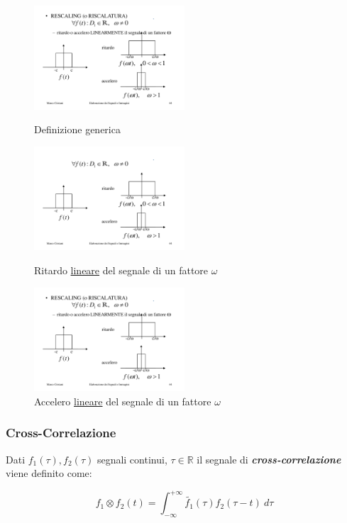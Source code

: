\documentclass[a4paper]{article}
\begin{document}
	\begin{figure}[!htp]
		\centering
		\includegraphics[width=0.5\textwidth]{img/rescaling.pdf}
		\caption{Definizione generica}\label{rescaling}
		\includegraphics[width=0.5\textwidth]{img/rescaling_ritardo.pdf}
		\caption{Ritardo \underline{lineare} del segnale di un fattore $\omega$}\label{rescaling_ritardo}
		\includegraphics[width=0.5\textwidth]{img/rescaling_accelero.pdf}
		\caption{Accelero \underline{lineare} del segnale di un fattore $\omega$}\label{rescaling_accelero}
	\end{figure}

	\subsubsection{Cross-Correlazione}
	
	Dati $f_1(\tau), f_2(\tau)$ segnali continui, $\tau\in\mathbb{R}$ il segnale di \textbf{\emph{cross-correlazione}} viene definito come:
	
	\begin{equation*}
		\displaystyle f_1 \otimes f_2 (t) = \int_{-\infty}^{+\infty} \tilde{f_1}(\tau) f_2(\tau - t)\: d\tau
	\end{equation*}
\end{document}
